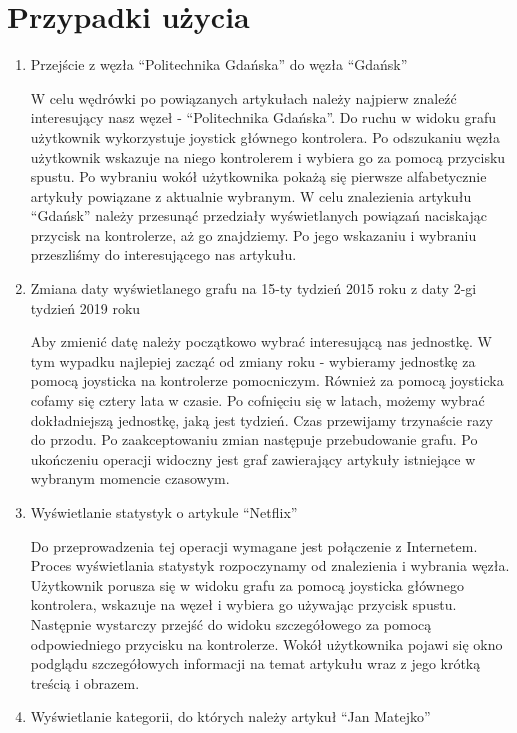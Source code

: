 \section{Przypadki użycia}
\begin{enumerate}
\item Przejście z węzła ``Politechnika Gdańska'' do węzła ``Gdańsk''

	W celu wędrówki po powiązanych artykułach należy najpierw znaleźć interesujący nasz węzeł - ``Politechnika Gdańska''. Do ruchu w widoku grafu użytkownik wykorzystuje joystick głównego kontrolera. Po odszukaniu węzła użytkownik wskazuje na niego kontrolerem i wybiera go za pomocą przycisku spustu. Po wybraniu wokół użytkownika pokażą się pierwsze alfabetycznie artykuły powiązane z aktualnie wybranym. W celu znalezienia artykułu ``Gdańsk'' należy przesunąć przedziały wyświetlanych powiązań naciskając przycisk na kontrolerze, aż go znajdziemy. Po jego wskazaniu i wybraniu przeszliśmy do interesującego nas artykułu.
	
\item Zmiana daty wyświetlanego grafu na 15-ty tydzień  2015 roku z daty 2-gi tydzień 2019 roku

	Aby zmienić datę należy początkowo wybrać interesującą nas jednostkę. W tym wypadku najlepiej zacząć od zmiany roku - wybieramy jednostkę za pomocą joysticka na kontrolerze pomocniczym. Również za pomocą joysticka cofamy się cztery lata w czasie. Po cofnięciu się w latach, możemy wybrać dokładniejszą jednostkę, jaką jest tydzień. Czas przewijamy trzynaście razy do przodu. Po zaakceptowaniu zmian następuje przebudowanie grafu. Po ukończeniu operacji widoczny jest graf zawierający artykuły istniejące w wybranym momencie czasowym.
	
\item Wyświetlanie statystyk o artykule ``Netflix''

	Do przeprowadzenia tej operacji wymagane jest połączenie z Internetem. Proces wyświetlania statystyk rozpoczynamy od znalezienia i wybrania węzła. Użytkownik porusza się w widoku grafu za pomocą joysticka głównego kontrolera, wskazuje na węzeł i wybiera go używając przycisk spustu. Następnie wystarczy przejść do widoku szczegółowego za pomocą odpowiedniego przycisku na kontrolerze. Wokół użytkownika pojawi się okno podglądu szczegółowych informacji na temat artykułu wraz z jego krótką treścią i obrazem.
	
\item Wyświetlanie kategorii, do których należy artykuł ``Jan Matejko''


\end{enumerate}
